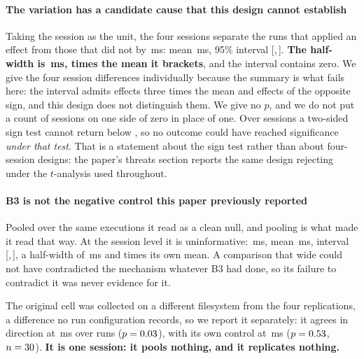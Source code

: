 \documentclass[10pt,journal,compsoc]{IEEEtran}
\begin{document}
\paragraph{The variation has a candidate cause that this design cannot
establish} Taking the session as the unit, the four sessions separate the runs
that applied an effect from those that did not by \KillLatencyPerSession{}\,ms:
mean \KillLatencyMean{}\,ms, 95\% interval
[\KillLatencyLow{},\,\KillLatencyHigh{}]. \textbf{The half-width is
\KillLatencyHalfWidth{}\,ms, \KillLatencyPrecisionRatio{} times the mean it
brackets}, and the interval contains zero. We give the four session differences
individually because the summary is what fails here: the interval admits effects
three times the mean and effects of the opposite sign, and this design does not
distinguish them. We give no $p$, and we do not put a count of sessions on one
side of zero in place of one. Over \KillLatencySessions{} sessions a two-sided
sign test cannot return below \KillLatencySignFloor{}, so no outcome could have
reached significance \emph{under that test}. That is a statement about the sign
test rather than about four-session designs: the paper's threats section
reports the same design rejecting under the $t$-analysis used throughout.

\paragraph{B3 is not the negative control this paper previously reported}
Pooled over the same \ReplicationRuns{} executions it read as a clean null, and
pooling is what made it read that way. At the session level it is
uninformative: \KillLatencyBthreePerSession{}\,ms, mean
\KillLatencyBthreeMean{}\,ms, interval
[\KillLatencyBthreeLow{},\,\KillLatencyBthreeHigh{}], a half-width of
\KillLatencyBthreeHalfWidth{}\,ms and \KillLatencyBthreePrecisionRatio{} times
its own mean. A comparison that wide could not have contradicted the mechanism
whatever B3 had done, so its failure to contradict it was never evidence for it.

The original cell was collected on a different filesystem from the four
replications, a difference no run configuration records, so we report it
separately: it agrees in direction at \KillLatencyOrigDiff{}\,ms over
\KillLatencyOrigN{} runs ($p = 0.03{}$), with its own control at
\KillLatencyBthreeOrigDiff{}\,ms ($p = 0.53{}$,
$n = 30{}$). \textbf{It is one session: it pools nothing,
and it replicates nothing.}
\end{document}
